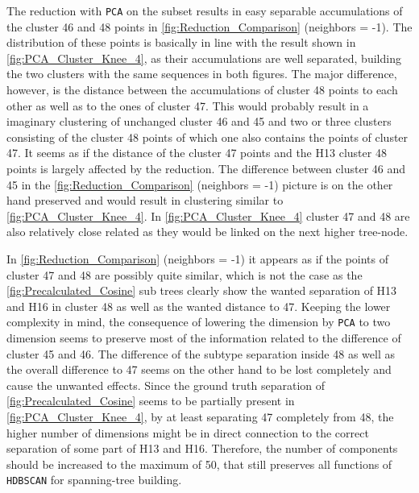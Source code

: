 \vspace{1em}

The reduction with \texttt{PCA} on the subset results in easy separable accumulations of the cluster 46 and 48 points in \autoref{fig:Reduction_Comparison} (neighbors = -1). The distribution of these points is basically in line with the result shown in \autoref{fig:PCA_Cluster_Knee_4}, as their accumulations are well separated, building the two clusters with the same sequences in both figures. The major difference, however, is the distance between the accumulations of cluster 48 points to each other as well as to the ones of cluster 47. This would probably result in a imaginary clustering of unchanged cluster 46 and 45 and two or three clusters consisting of the cluster 48 points of which one also contains the points of cluster 47. It seems as if the distance of the cluster 47 points and the H13 cluster 48 points is largely affected by the reduction. The difference between cluster 46 and 45 in the \autoref{fig:Reduction_Comparison} (neighbors = -1) picture is on the other hand preserved and would result in clustering similar to \autoref{fig:PCA_Cluster_Knee_4}. In \autoref{fig:PCA_Cluster_Knee_4} cluster 47 and 48 are also relatively close related as they would be linked on the next higher tree-node.

\vspace{1em}

In \autoref{fig:Reduction_Comparison} (neighbors = -1) it appears as if the points of cluster 47 and 48 are possibly quite similar, which is not the case as the \autoref{fig:Precalculated_Cosine} sub trees clearly show the wanted separation of H13 and H16 in cluster 48 as well as the wanted distance to 47. Keeping the lower complexity in mind, the consequence of lowering the dimension by \texttt{PCA} to two dimension seems to preserve most of the information related to the difference of cluster 45 and 46. The difference of the subtype separation inside 48 as well as the overall difference to 47 seems on the other hand to be lost completely and cause the unwanted effects. Since the ground truth separation of \autoref{fig:Precalculated_Cosine} seems to be partially present in \autoref{fig:PCA_Cluster_Knee_4}, by at least separating 47 completely from 48, the higher number of dimensions might be in direct connection to the correct separation of some part of H13 and H16. Therefore, the number of components should be increased to the maximum of 50, that still preserves all functions of \texttt{HDBSCAN} for spanning-tree building. 

